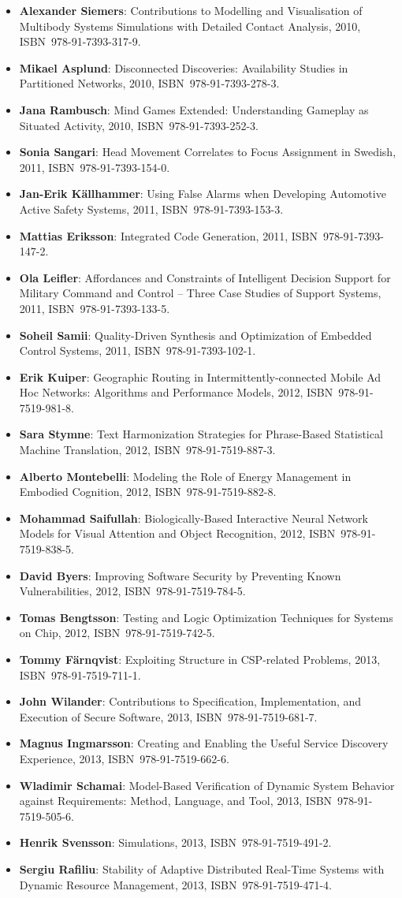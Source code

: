 \documentclass[a4paper,showtrims,twocolumn]{memoir}
\newenvironment{theses}{
  \begin{itemize}
    \setlength{\itemsep}{0.2em}
    \setlength{\parskip}{0em}
    \setlength{\parsep}{0em}
}{
  \end{itemize}
}
\newcommand{\thesis}[5]{\item[No. #1] \textbf{#2}: #3, #4, ISBN~#5.}
\begin{document}
\begin{theses}
    \thesis{1337}{Alexander Siemers}{Contributions to Modelling and Visualisation of Multibody Systems Simulations with Detailed Contact Analysis}{2010}{978-91-7393-317-9}
    \thesis{1354}{Mikael Asplund}{Disconnected Discoveries: Availability Studies in Partitioned Networks}{2010}{978-91-7393-278-3}
    \thesis{1359}{Jana Rambusch}{Mind Games Extended: Understanding Gameplay as Situated Activity}{2010}{978-91-7393-252-3}
    \thesis{1373}{Sonia Sangari}{Head Movement Correlates to Focus Assignment in Swedish}{2011}{978-91-7393-154-0}
    \thesis{1374}{Jan-Erik Källhammer}{Using False Alarms when Developing Automotive Active Safety Systems}{2011}{978-91-7393-153-3}
    \thesis{1375}{Mattias Eriksson}{Integrated Code Generation}{2011}{978-91-7393-147-2}
    \thesis{1381}{Ola Leifler}{Affordances and Constraints of Intelligent Decision Support for Military Command and Control – Three Case Studies of Support Systems}{2011}{978-91-7393-133-5}
    \thesis{1386}{Soheil Samii}{Quality-Driven Synthesis and Optimization of Embedded Control Systems}{2011}{978-91-7393-102-1}
    \thesis{1419}{Erik Kuiper}{Geographic Routing in Intermittently-connected Mobile Ad Hoc Networks: Algorithms and Performance Models}{2012}{978-91-7519-981-8}
    \thesis{1451}{Sara Stymne}{Text Harmonization Strategies for Phrase-Based Statistical Machine Translation}{2012}{978-91-7519-887-3}
    \thesis{1455}{Alberto Montebelli}{Modeling the Role of Energy Management in Embodied Cognition}{2012}{978-91-7519-882-8}
    \thesis{1465}{Mohammad Saifullah}{Biologically-Based Interactive  Neural Network Models for Visual Attention and Object Recognition}{2012}{978-91-7519-838-5}
    \thesis{1481}{David Byers}{Improving Software Security by Preventing Known Vulnerabilities}{2012}{978-91-7519-784-5}
    \thesis{1490}{Tomas Bengtsson}{Testing and Logic Optimization Techniques for Systems on Chip}{2012}{978-91-7519-742-5}
    \thesis{1496}{Tommy Färnqvist}{Exploiting Structure in CSP-related Problems}{2013}{978-91-7519-711-1}
    \thesis{1503}{John Wilander}{Contributions to Specification, Implementation, and Execution of Secure Software}{2013}{978-91-7519-681-7}
    \thesis{1506}{Magnus Ingmarsson}{Creating and Enabling the Useful Service Discovery Experience}{2013}{978-91-7519-662-6}
    \thesis{1547}{Wladimir Schamai}{Model-Based Verification of Dynamic System Behavior against Requirements: Method, Language, and Tool}{2013}{978-91-7519-505-6}
    \thesis{1551}{Henrik Svensson}{Simulations}{2013}{978-91-7519-491-2}
    \thesis{1559}{Sergiu Rafiliu}{Stability of Adaptive Distributed Real-Time Systems with Dynamic Resource Management}{2013}{978-91-7519-471-4}

\end{theses}
\end{document}
